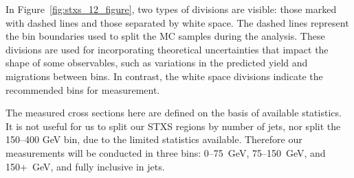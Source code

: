 In Figure~\ref{fig:stxs_12_figure}, two types of divisions are visible: those marked with dashed lines and those separated by white space. The dashed lines represent the bin boundaries used to split the MC samples during the analysis. These divisions are used for incorporating theoretical uncertainties that impact the shape of some observables, such as variations in the predicted yield and migrations between bins. In contrast, the white space divisions indicate the recommended bins for measurement.

The measured cross sections here are defined on the basis of available statistics. It is not useful for us to split our STXS regions by number of jets, nor split the 150--400 GeV \pt{} bin, due to the limited statistics available. Therefore our measurements will be conducted in three \pt{} bins: 0--75~GeV, 75--150~GeV, and 150+~GeV, and fully inclusive in jets. 
